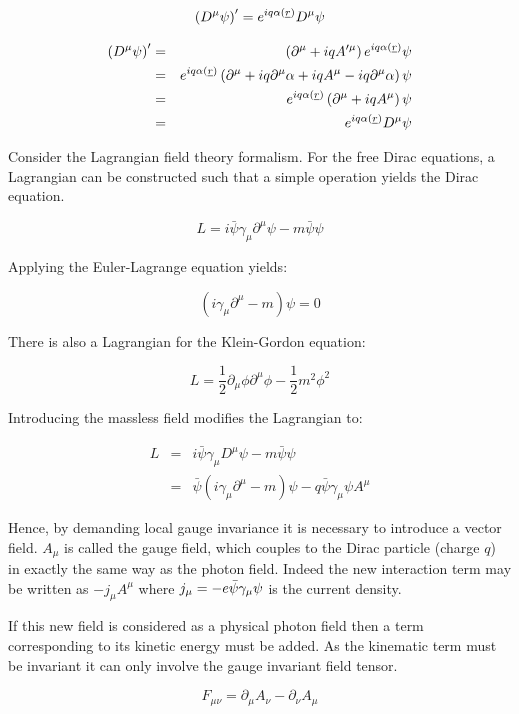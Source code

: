 \[
  \left(D^{\mu}\psi\right)' = e^{iq\alpha(\underline{r})}D^{\mu}\psi
\]

\begin{eqnarray*}
  \left( D^{\mu}\psi\right)' & = & \left(\partial^{\mu} + iqA'^{\mu}\right)e^{iq\alpha(\underline{r})}\psi \\
  & = & e^{iq\alpha(\underline{r})}\left( \partial^{\mu} + iq\partial^{\mu}\alpha + iqA^{\mu} - iq\partial^{\mu}\alpha\right)\psi \\
  & = & e^{iq\alpha(\underline{r})}\left(\partial^{\mu} + iqA^{\mu}\right)\psi \\
   & = & e^{iq\alpha(\underline{r})}D^{\mu}\psi
\end{eqnarray*}

Consider the Lagrangian field theory formalism.  For the free Dirac equations, a Lagrangian can be constructed such that a simple operation yields the Dirac equation.

\[
  L = i\bar{\psi}\gamma_{\mu}\partial^{\mu}\psi - m\bar{\psi}\psi
\]

Applying the Euler-Lagrange equation yields:

\[
  \left(i\gamma_{\mu}\partial^{\mu} - m\right)\psi = 0
\]

There is also a Lagrangian for the Klein-Gordon equation:

\[
  L = \frac{1}{2}\partial_{\mu}\phi\partial^{\mu}\phi - \frac{1}{2}m^2\phi^2
\]

Introducing the massless field modifies the Lagrangian to:

\begin{eqnarray*}
  L & = & i\bar{\psi}\gamma_{\mu}D^{\mu}\psi - m\bar{\psi}\psi \\
    & = & \bar{\psi}\left(i\gamma_{\mu}\partial^{\mu} - m\right)\psi - q\bar{\psi}\gamma_{\mu}\psi A^{\mu}
\end{eqnarray*}

Hence, by demanding local gauge invariance it is necessary to introduce a vector field.  $A_{\mu}$ is called the gauge field, which couples to the Dirac particle (charge $q$) in exactly  the same way as the photon field.  Indeed the new interaction term may be written as $-j_{\mu}A^{\mu}$ where $j_{\mu} = -e\bar{\psi}\gamma_{\mu}\psi$ is the current density.

If this new field is considered as a physical photon field then a term corresponding to its kinetic energy must be added.  As the kinematic term must be invariant it can only involve the gauge invariant field tensor.

\[
  F_{\mu\nu} = \partial_{\mu}A_{\nu} - \partial_{\nu}A_{\mu}
\]

